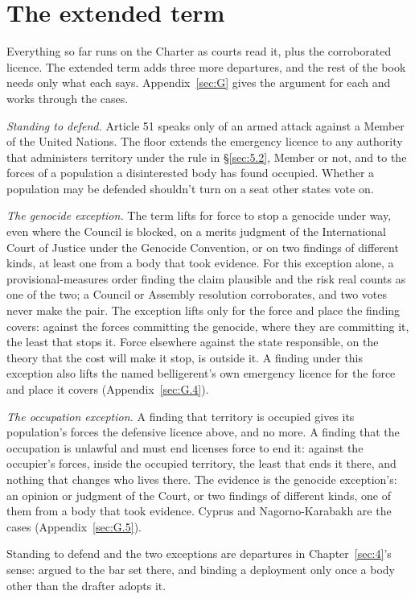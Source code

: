 \section{The extended term}
\label{sec:5.7}
Everything so far runs on the Charter as courts read it, plus the corroborated licence. The extended term adds three more departures, and the rest of the book needs only what each says. Appendix~\ref{sec:G} gives the argument for each and works through the cases.

\emph{Standing to defend.} Article 51 speaks only of an armed attack against a Member of the United Nations. The floor extends the emergency licence to any authority that administers territory under the rule in \S\ref{sec:5.2}, Member or not, and to the forces of a population a disinterested body has found occupied. Whether a population may be defended shouldn't turn on a seat other states vote on.

\emph{The genocide exception.} The term lifts for force to stop a genocide under way, even where the Council is blocked, on a merits judgment of the International Court of Justice under the Genocide Convention, or on two findings of different kinds, at least one from a body that took evidence. For this exception alone, a provisional-measures order finding the claim plausible and the risk real counts as one of the two; a Council or Assembly resolution corroborates, and two votes never make the pair. The exception lifts only for the force and place the finding covers: against the forces committing the genocide, where they are committing it, the least that stops it. Force elsewhere against the state responsible, on the theory that the cost will make it stop, is outside it. A finding under this exception also lifts the named belligerent's own emergency licence for the force and place it covers (Appendix~\ref{sec:G.4}).

\emph{The occupation exception.} A finding that territory is occupied gives its population's forces the defensive licence above, and no more. A finding that the occupation is unlawful and must end licenses force to end it: against the occupier's forces, inside the occupied territory, the least that ends it there, and nothing that changes who lives there. The evidence is the genocide exception's: an opinion or judgment of the Court, or two findings of different kinds, one of them from a body that took evidence. Cyprus and Nagorno-Karabakh are the cases (Appendix~\ref{sec:G.5}).

Standing to defend and the two exceptions are departures in Chapter~\ref{sec:4}'s sense: argued to the bar set there, and binding a deployment only once a body other than the drafter adopts it.
